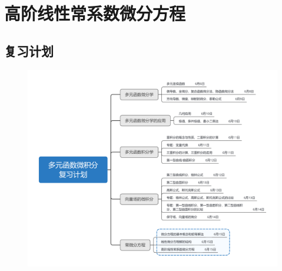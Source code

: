 \documentclass[12pt,UTF8,fleqn]{ctexart}
\begin{document}
\setcounter{section}{17}
\section{高阶线性常系数微分方程}
\subsection{复习计划}
\begin{figure}[H]
\begin{center}
\includegraphics[height=0.5\textheight]{Figures20190615/plan.png}
\end{center}
\end{figure}
\end{document}
